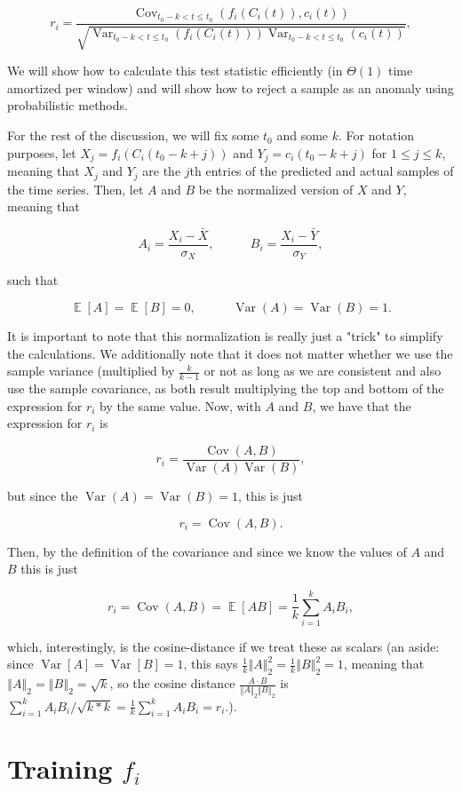 \documentclass{article}
\newcommand{\norm}[1]{\left\Vert #1 \right\Vert}
\DeclareMathOperator{\E}{\mathbb{E}}
\DeclareMathOperator{\Cov}{\mathrm{Cov}}
\DeclareMathOperator{\Var}{\mathrm{Var}}
\begin{document}
$$r_i = \frac{\Cov_{t_0 - k < t \le t_0}(f_i(C_i(t)), c_i(t))}{\sqrt{\Var_{t_0 - k < t \le t_0}(f_i(C_i(t)))\Var_{t_0 - k < t \le t_0}(c_i(t))}},$$

We will show how to calculate this test statistic efficiently (in $\Theta(1)$ time amortized per window) and will show how to reject a sample as an anomaly using probabilistic methods.

For the rest of the discussion, we will fix some $t_0$ and some $k$. For notation purposes, let $X_j = f_i(C_i(t_0 - k + j))$ and $Y_j = c_i(t_0 - k + j)$ for $1 \le j \le k$, meaning that $X_j$ and $Y_j$ are the $j$th entries of the predicted and actual samples of the time series. Then, let $A$ and $B$ be the normalized version of $X$ and $Y$, meaning that

$$A_i = \frac{X_i - \bar X}{\sigma_X},
~~~~~~~~~~~~~
B_i = \frac{X_i - \bar Y}{\sigma_Y},$$

such that

$$\E[A] = \E[B] = 0,
~~~~~~~~~~~~~
\Var(A) = \Var(B) = 1.$$

It is important to note that this normalization is really just a "trick" to simplify the calculations. We additionally note that it does not matter whether we use the sample variance (multiplied by $\frac{k}{k - 1}$ or not as long as we are consistent and also use the sample covariance, as both result multiplying the top and bottom of the expression for $r_i$ by the same value. Now, with $A$ and $B$, we have that the expression for $r_i$ is

$$r_i = \frac{\Cov(A, B)}{\Var(A)\Var(B)},$$

but since the $\Var(A) = \Var(B) = 1$, this is just

$$r_i = \Cov(A, B).$$

Then, by the definition of the covariance and since we know the values of $A$ and $B$ this is just

$$r_i = \Cov(A, B) = \E[AB] = \frac{1}{k} \sum_{i = 1}^k A_i B_i,$$

which, interestingly, is the cosine-distance if we treat these as scalars (an aside: since $\Var[A] = \Var[B] = 1$, this says $\frac{1}{k} \norm{A}_2^2 = \frac{1}{k} \norm{B}_2^2 = 1$, meaning that $\norm{A}_2 = \norm{B}_2 = \sqrt{k}$, so the cosine distance $\frac{A \cdot B}{\norm{A}_2 \norm{B}_2}$ is $\sum_{i = 1}^k A_i B_i / \sqrt{k * k} = \frac{1}{k} \sum_{i = 1}^k A_i B_i = r_i.$).

\section{Training $f_i$}
\end{document}
